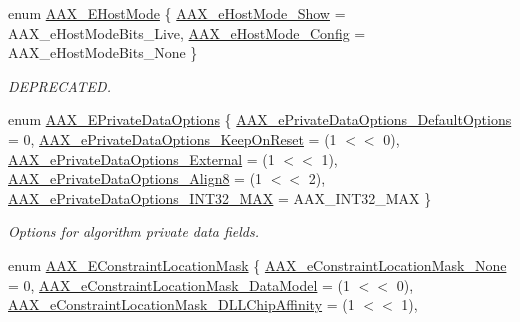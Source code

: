 \begin{DoxyCompactItemize}
enum \mbox{\hyperlink{a00491_af7d77416967955e258539694870f395a}{A\+A\+X\+\_\+\+E\+Host\+Mode}} \{ \mbox{\hyperlink{a00491_af7d77416967955e258539694870f395aabcdafa25dc3d69fad51b53e4747eed0c}{A\+A\+X\+\_\+e\+Host\+Mode\+\_\+\+Show}} = A\+A\+X\+\_\+e\+Host\+Mode\+Bits\+\_\+\+Live, 
\mbox{\hyperlink{a00491_af7d77416967955e258539694870f395aa24a5c6d96b5ae069266976193f07cb6f}{A\+A\+X\+\_\+e\+Host\+Mode\+\_\+\+Config}} = A\+A\+X\+\_\+e\+Host\+Mode\+Bits\+\_\+\+None
 \}
\begin{DoxyCompactList}\small\item\em D\+E\+P\+R\+E\+C\+A\+T\+ED. \end{DoxyCompactList}\item 
enum \mbox{\hyperlink{a00491_a9f1ef2cb64daf30eaf145dfbb8cd0d00}{A\+A\+X\+\_\+\+E\+Private\+Data\+Options}} \{ \newline
\mbox{\hyperlink{a00491_a9f1ef2cb64daf30eaf145dfbb8cd0d00a59458e9bf18919c51e59eb2fd6e84a9a}{A\+A\+X\+\_\+e\+Private\+Data\+Options\+\_\+\+Default\+Options}} = 0, 
\mbox{\hyperlink{a00491_a9f1ef2cb64daf30eaf145dfbb8cd0d00a393309ed2a9c5d784e837705a58854ab}{A\+A\+X\+\_\+e\+Private\+Data\+Options\+\_\+\+Keep\+On\+Reset}} = (1 $<$$<$ 0), 
\mbox{\hyperlink{a00491_a9f1ef2cb64daf30eaf145dfbb8cd0d00a75aef62fea40f9bba18502add99130b2}{A\+A\+X\+\_\+e\+Private\+Data\+Options\+\_\+\+External}} = (1 $<$$<$ 1), 
\mbox{\hyperlink{a00491_a9f1ef2cb64daf30eaf145dfbb8cd0d00aa683ca703d91945336394793308ba4b1}{A\+A\+X\+\_\+e\+Private\+Data\+Options\+\_\+\+Align8}} = (1 $<$$<$ 2), 
\newline
\mbox{\hyperlink{a00491_a9f1ef2cb64daf30eaf145dfbb8cd0d00a9c5ada412f70b8a06d1bddb469ef86f2}{A\+A\+X\+\_\+e\+Private\+Data\+Options\+\_\+\+I\+N\+T32\+\_\+\+M\+AX}} = A\+A\+X\+\_\+\+I\+N\+T32\+\_\+\+M\+AX
 \}
\begin{DoxyCompactList}\small\item\em Options for algorithm private data fields. \end{DoxyCompactList}\item 
enum \mbox{\hyperlink{a00491_a0c5d795c1fd021c5b9b541febc34601a}{A\+A\+X\+\_\+\+E\+Constraint\+Location\+Mask}} \{ \mbox{\hyperlink{a00491_a0c5d795c1fd021c5b9b541febc34601aad4acf90ffba6c9b3290d5e8708b2898a}{A\+A\+X\+\_\+e\+Constraint\+Location\+Mask\+\_\+\+None}} = 0, 
\mbox{\hyperlink{a00491_a0c5d795c1fd021c5b9b541febc34601aa027df08c137702400a92719828bea44b}{A\+A\+X\+\_\+e\+Constraint\+Location\+Mask\+\_\+\+Data\+Model}} = (1 $<$$<$ 0), 
\mbox{\hyperlink{a00491_a0c5d795c1fd021c5b9b541febc34601aa0bcc93a22d3477c447eb751514e8fa94}{A\+A\+X\+\_\+e\+Constraint\+Location\+Mask\+\_\+\+D\+L\+L\+Chip\+Affinity}} = (1 $<$$<$ 1), 
$$
\end{DoxyCompactItemize}

